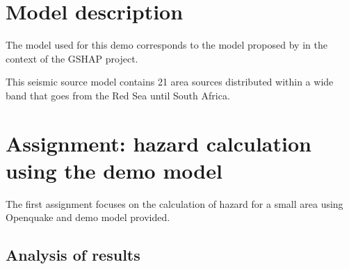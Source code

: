 \section{Model description}

The model used for this demo corresponds to the model proposed by 
\citet{midzi1999} in the context of the GSHAP project.

This seismic source model contains 21 area sources distributed within a wide 
band that goes from the Red Sea until South Africa.

\section{Assignment: hazard calculation using the demo model}
The first assignment focuses on the calculation of hazard for a small area 
using Openquake and demo model provided.

\subsection{Analysis of results}
\cleardoublepage
